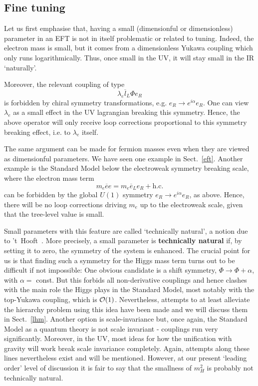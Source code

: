 \documentclass[12pt]{article}
\newcommand{\be}{\begin{equation}}
\newcommand{\ee}{\end{equation}}
\newcommand{\ol}{\overline}
\numberwithin{equation}{section}
\begin{document}
\subsection{Fine tuning}\label{fts}

Let us first emphasise that, having a small (dimensionful or dimensionless) parameter in an EFT is not in itself problematic or related to tuning. Indeed, the electron mass is small, but it comes from a dimensionless Yukawa coupling which only runs logarithmically. Thus, once small in the UV, it will stay small in the IR `naturally'.

Moreover, the relevant coupling of type
\be
\lambda_e\ol{l}_L\Phi e_R
\ee
is forbidden by chiral symmetry transformations, e.g. $e_R\to e^{i\alpha}e_R$. One can view $\lambda_e$ as a small effect in the UV lagrangian breaking this symmetry. Hence, the above operator will only receive loop corrections proportional to this symmetry breaking effect, i.e. to $\lambda_e$ itself. 

The same argument can be made for fermion masses even when they are viewed as dimensionful parameters. We have seen one example in Sect.~\ref{eft}. 
Another example is the Standard Model below the electroweak symmetry breaking scale, where the electron mass term
\be
m_e\ol{e}e=m_e\ol{e}_Le_R+\mbox{h.c.}
\ee
can be forbidden by the global $U(1)$ symmetry $e_R\to e^{i\alpha}e_R$, as above. Hence, there will be no loop corrections driving $m_e$ up to the electroweak scale, given that the tree-level value is small.

Small parameters with this feature are called `technically natural', a notion due to 't~Hooft~\cite{tHooft:1980xss}. More precisely, a small parameter is {\bf technically natural} if, by setting it to zero, the symmetry of the system is enhanced. The crucial point for us is that finding such a symmetry for the Higgs mass term turns out to be difficult if not impossible: One obvious candidate is a shift symmetry, $\Phi\to \Phi+\alpha$, with $\alpha=\,\,$const. But this forbids all non-derivative couplings and hence clashes with the main role the Higgs plays in the Standard Model, most notably with the top-Yukawa coupling, which is ${\cal O}(1)$. Nevertheless, attempts to at least alleviate the hierarchy problem using this idea have been made and we will discuss them in Sect.~\ref{lhm}. Another option is scale-invariance but, once again, the Standard Model as a quantum theory is not scale invariant - couplings run very significantly. Moreover, in the UV, most ideas for how the unification with gravity will work break scale invariance completely. Again, attempts along these lines nevertheless exist and will be mentioned. However, at our present `leading order' level of discussion it is fair to say that the smallness of $m_H^2$ is probably not technically natural. 
\end{document}
